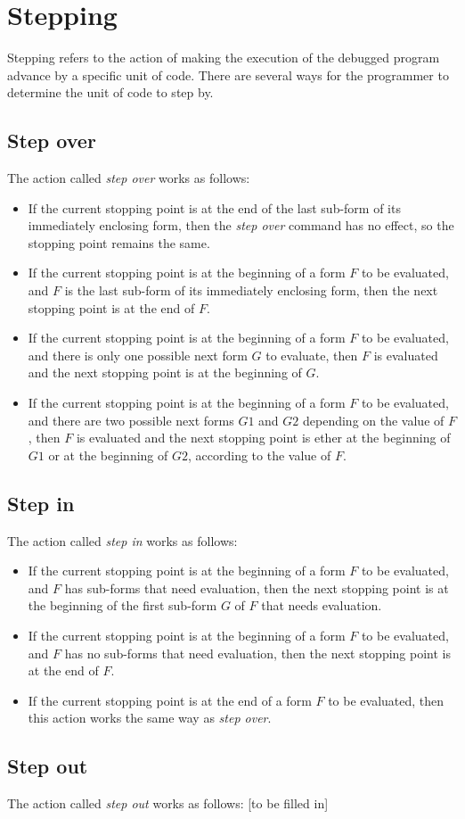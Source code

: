 \chapter{Stepping}

Stepping refers to the action of making the execution of the debugged
program advance by a specific unit of code.  There are several ways
for the programmer to determine the unit of code to step by.

\section{Step over}

The action called \emph{step over} works as follows:

\begin{itemize}
\item If the current stopping point is at the end of the last sub-form
  of its immediately enclosing form, then the \emph{step over} command
  has no effect, so the stopping point remains the same.
\item If the current stopping point is at the beginning of a form $F$
  to be evaluated, and $F$ is the last sub-form of its immediately
  enclosing form, then the next stopping point is at the end of $F$.
\item If the current stopping point is at the beginning of a form $F$
  to be evaluated, and there is only one possible next form $G$ to
  evaluate, then $F$ is evaluated and the next stopping point is at
  the beginning of $G$.
\item If the current stopping point is at the beginning of a form $F$
  to be evaluated, and there are two possible next forms $G1$ and $G2$
  depending on the value of $F$, then $F$ is evaluated and the next
  stopping point is ether at the beginning of $G1$ or at the beginning
  of $G2$, according to the value of $F$.
\end{itemize}

\section{Step in}

The action called \emph{step in} works as follows:

\begin{itemize}
\item If the current stopping point is at the beginning of a form $F$
  to be evaluated, and $F$ has sub-forms that need evaluation, then
  the next stopping point is at the beginning of the first sub-form
  $G$ of $F$ that needs evaluation.
\item If the current stopping point is at the beginning of a form $F$
  to be evaluated, and $F$ has no sub-forms that need evaluation, then
  the next stopping point is at the end of $F$.
\item If the current stopping point is at the end of a form $F$ to be
  evaluated, then this action works the same way as \emph{step over}.
\end{itemize}

\section{Step out}

The action called \emph{step out} works as follows:
[to be filled in]

